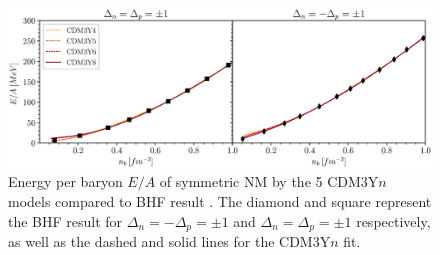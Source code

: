 \begin{figure}[t]
        \centering
        \includegraphics[width=\textwidth]{fig/BHF_fit.eps}
        \caption{Energy per baryon $E/A$ of symmetric \gls{NM} by the 5 CDM3Y$n$ models compared to \gls{BHF} result \cite{vidana2002equation}. The diamond and square represent the \gls{BHF} result for $\Delta_n=-\Delta_p=\pm 1$ and $\Delta_n=\Delta_p=\pm 1$ respectively, as well as the dashed and solid lines for the CDM3Y$n$ fit.}
        \label{fig:bhf}
\end{figure} 

